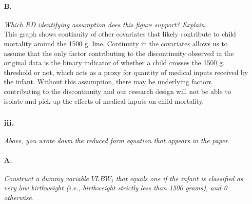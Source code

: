 \documentclass[
]{article}
\newenvironment{Shaded}{\begin{snugshade}}{\end{snugshade}}
\newcommand{\CommentTok}[1]{\textcolor[rgb]{0.56,0.35,0.01}{\textit{#1}}}
\newcommand{\DataTypeTok}[1]{\textcolor[rgb]{0.13,0.29,0.53}{#1}}
\newcommand{\DecValTok}[1]{\textcolor[rgb]{0.00,0.00,0.81}{#1}}
\newcommand{\KeywordTok}[1]{\textcolor[rgb]{0.13,0.29,0.53}{\textbf{#1}}}
\newcommand{\NormalTok}[1]{#1}
\newcommand{\OperatorTok}[1]{\textcolor[rgb]{0.81,0.36,0.00}{\textbf{#1}}}
\newcommand{\StringTok}[1]{\textcolor[rgb]{0.31,0.60,0.02}{#1}}
\begin{document}
\hypertarget{b.-2}{%
\paragraph{B.}\label{b.-2}}

\textit{Which RD identifying assumption does this figure support? Explain.}\\
This graph shows continuity of other covariates that likely contribute
to child mortality around the 1500 g. line. Continuity in the covariates
allows us to assume that the only factor contributing to the
discontinuity observed in the original data is the binary indicator of
whether a child crosses the 1500 g. threshold or not, which acts as a
proxy for quantity of medical inputs received by the infant. Without
this assumption, there may be underlying factors contributing to the
discontinuity and our research design will not be able to isolate and
pick up the effects of medical inputs on child mortality.

\hypertarget{iii.}{%
\subsubsection{iii.}\label{iii.}}

\textit{Above, you wrote down the reduced form equation that appears in the paper.}

\break

\hypertarget{a.-3}{%
\paragraph{A.}\label{a.-3}}

\textit{Construct a dummy variable $VLBW_i$ that equals one if the infant is classified as very low birthweight (i.e., birthweight strictly less than 1500 grams), and 0 otherwise.}

\begin{Shaded}
\end{Shaded}
\end{document}
